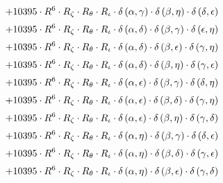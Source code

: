 \begin{subequations}
\begin{gather}
 \\[0.2em] \notag 		 + 10395 \cdot R^{6} \cdot R_{\zeta{}} \cdot R_{\theta{}} \cdot R_{\iota{}} \cdot \delta{}\left(\alpha{}, \gamma{}\right) \cdot \delta{}\left(\beta{}, \eta{}\right) \cdot \delta{}\left(\delta{}, \epsilon{}\right) 
 \\[0.2em] \notag 		 + 10395 \cdot R^{6} \cdot R_{\zeta{}} \cdot R_{\theta{}} \cdot R_{\iota{}} \cdot \delta{}\left(\alpha{}, \delta{}\right) \cdot \delta{}\left(\beta{}, \gamma{}\right) \cdot \delta{}\left(\epsilon{}, \eta{}\right) 
 \\[0.2em] \notag 		 + 10395 \cdot R^{6} \cdot R_{\zeta{}} \cdot R_{\theta{}} \cdot R_{\iota{}} \cdot \delta{}\left(\alpha{}, \delta{}\right) \cdot \delta{}\left(\beta{}, \epsilon{}\right) \cdot \delta{}\left(\gamma{}, \eta{}\right) 
 \\[0.2em] \notag 		 + 10395 \cdot R^{6} \cdot R_{\zeta{}} \cdot R_{\theta{}} \cdot R_{\iota{}} \cdot \delta{}\left(\alpha{}, \delta{}\right) \cdot \delta{}\left(\beta{}, \eta{}\right) \cdot \delta{}\left(\gamma{}, \epsilon{}\right) 
 \\[0.2em] \notag 		 + 10395 \cdot R^{6} \cdot R_{\zeta{}} \cdot R_{\theta{}} \cdot R_{\iota{}} \cdot \delta{}\left(\alpha{}, \epsilon{}\right) \cdot \delta{}\left(\beta{}, \gamma{}\right) \cdot \delta{}\left(\delta{}, \eta{}\right) 
 \\[0.2em] \notag 		 + 10395 \cdot R^{6} \cdot R_{\zeta{}} \cdot R_{\theta{}} \cdot R_{\iota{}} \cdot \delta{}\left(\alpha{}, \epsilon{}\right) \cdot \delta{}\left(\beta{}, \delta{}\right) \cdot \delta{}\left(\gamma{}, \eta{}\right) 
 \\[0.2em] \notag 		 + 10395 \cdot R^{6} \cdot R_{\zeta{}} \cdot R_{\theta{}} \cdot R_{\iota{}} \cdot \delta{}\left(\alpha{}, \epsilon{}\right) \cdot \delta{}\left(\beta{}, \eta{}\right) \cdot \delta{}\left(\gamma{}, \delta{}\right) 
 \\[0.2em] \notag 		 + 10395 \cdot R^{6} \cdot R_{\zeta{}} \cdot R_{\theta{}} \cdot R_{\iota{}} \cdot \delta{}\left(\alpha{}, \eta{}\right) \cdot \delta{}\left(\beta{}, \gamma{}\right) \cdot \delta{}\left(\delta{}, \epsilon{}\right) 
 \\[0.2em] \notag 		 + 10395 \cdot R^{6} \cdot R_{\zeta{}} \cdot R_{\theta{}} \cdot R_{\iota{}} \cdot \delta{}\left(\alpha{}, \eta{}\right) \cdot \delta{}\left(\beta{}, \delta{}\right) \cdot \delta{}\left(\gamma{}, \epsilon{}\right) 
 \\[0.2em] \notag 		 + 10395 \cdot R^{6} \cdot R_{\zeta{}} \cdot R_{\theta{}} \cdot R_{\iota{}} \cdot \delta{}\left(\alpha{}, \eta{}\right) \cdot \delta{}\left(\beta{}, \epsilon{}\right) \cdot \delta{}\left(\gamma{}, \delta{}\right) 

\end{gather}
\end{subequations}
